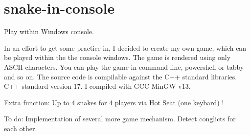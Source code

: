 \chapter{snake-\/in-\/console}
\hypertarget{md__c_1_2_projects_2___cpp_projects_2_my_apps_2_snake_2_r_e_a_d_m_e}{}\label{md__c_1_2_projects_2___cpp_projects_2_my_apps_2_snake_2_r_e_a_d_m_e}
\label{md__c_1_2_projects_2___cpp_projects_2_my_apps_2_snake_2_r_e_a_d_m_e_autotoc_md0}%
%
 Play {\itshape {\bfseries{}}} within Windows console.

In an effort to get some practice in, I decided to create my own  game, which can be played within the the console windows. The  game is rendered using only ASCII characters. You can play the game in command line, powershell or tabby and so on. The source code is compilable against the C++ standard libraries. C++ standard version 17. I compiled with GCC Min\+GW v13.

Extra function\+: Up to 4 snakes for 4 players via Hot Seat (one keybard) !

To do\+: Implementation of several more game mechanism. Detect conglicts for each other.


\begin{DoxyCode}{0}
\DoxyCodeLine{-\/-\/-\/-\/-\/-\/-\/-\/-\/-\/-\/-\/-\/-\/-\/-\/-\/-\/-\/-\/-\/-\/-\/-\/-\/-\/-\/-\/-\/-\/-\/-\/-\/-\/-\/-\/-\/-\/-\/-\/}
\DoxyCodeLine{\ \_\_\_\ \ \ \ \ \ \ \ \ \ \ \ \ \ \_}
\DoxyCodeLine{/\ \_\_|\ \_\ \_\ \ \ \_\_\ \_\ |\ |\_\_\_\_\_}
\DoxyCodeLine{-\/-\/-\/-\/-\/-\/-\/-\/-\/-\/-\/-\/-\/-\/-\/-\/-\/-\/-\/-\/-\/-\/-\/-\/-\/-\/-\/-\/-\/-\/-\/-\/-\/-\/-\/-\/-\/-\/-\/-\/}
\DoxyCodeLine{}

\end{DoxyCode}
 
